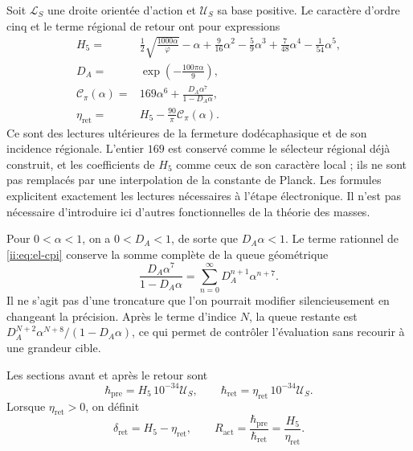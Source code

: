 Soit \(\mathcal L_S\) une droite orientée d'action et \(\mathcal U_S\)
sa base positive. Le caractère d'ordre cinq et le terme régional de
retour ont pour expressions
\begin{align}
 H_5={}&\frac12\sqrt{\frac{1000\alpha}{\varphi}}-\alpha
   +\frac9{16}\alpha^2-\frac59\alpha^3
   +\frac7{48}\alpha^4-\frac1{54}\alpha^5,
   \label{ii:eq:el-h5}\\
 D_A={}&\exp\!\left(-\frac{100\pi\alpha}{9}\right),
   \label{ii:eq:el-da}\\
 \mathcal C_\pi(\alpha)={}&169\alpha^6+
       \frac{D_A\alpha^7}{1-D_A\alpha},
   \label{ii:eq:el-cpi}\\
 \eta_{\mathrm{ret}}={}&H_5-\frac{90}{\pi}\mathcal C_\pi(\alpha).
   \label{ii:eq:el-eta}
\end{align}
Ce sont des lectures ultérieures de la fermeture dodécaphasique et de son
incidence régionale. L'entier \(169\) est conservé comme le sélecteur
régional déjà construit, et les coefficients de \(H_5\) comme ceux de son
caractère local ; ils ne sont pas remplacés par une interpolation de la constante de
Planck. Les formules explicitent exactement les lectures nécessaires
à l'étape électronique. Il n'est pas nécessaire d'introduire ici d'autres
fonctionnelles de la théorie des masses.

Pour \(0<\alpha<1\), on a \(0<D_A<1\), de sorte que
\(D_A\alpha<1\). Le terme rationnel de \eqref{ii:eq:el-cpi} conserve la
somme complète de la queue géométrique
\begin{equation}
 \frac{D_A\alpha^7}{1-D_A\alpha}
 =\sum_{n=0}^{\infty}D_A^{n+1}\alpha^{n+7}.
 \label{ii:eq:el-cola-regional}
\end{equation}
Il ne s'agit pas d'une troncature que l'on pourrait modifier silencieusement en changeant la
précision. Après le terme d'indice \(N\), la queue restante est
\(D_A^{N+2}\alpha^{N+8}/(1-D_A\alpha)\), ce qui permet de contrôler
l'évaluation sans recourir à une grandeur cible.

\begin{definition}
Les sections avant et après le retour sont
\begin{equation}
 \hbar_{\mathrm{pre}}=H_5\,10^{-34}\mathcal U_S,
 \qquad
 \hbar_{\mathrm{ret}}=\eta_{\mathrm{ret}}\,10^{-34}\mathcal U_S.
 \label{ii:eq:el-secciones-accion}
\end{equation}
Lorsque \(\eta_{\mathrm{ret}}>0\), on définit
\begin{equation}
 \delta_{\mathrm{ret}}=H_5-\eta_{\mathrm{ret}},\qquad
 R_{\mathrm{act}}=\frac{\hbar_{\mathrm{pre}}}{\hbar_{\mathrm{ret}}}
 =\frac{H_5}{\eta_{\mathrm{ret}}}.
 \label{ii:eq:el-ratio}
\end{equation}
\end{definition}

